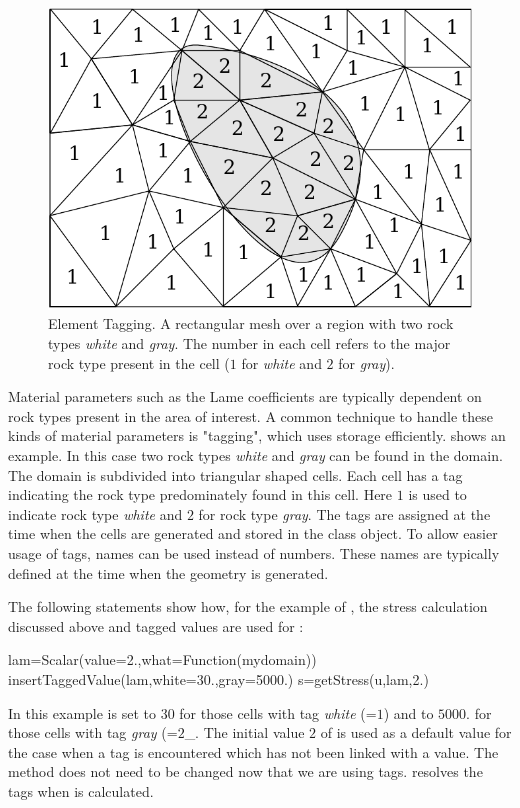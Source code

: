 \begin{figure}
\includegraphics[width=\textwidth]{figures/EscriptDiagram2}
\caption{\label{Figure: tag}Element Tagging. A rectangular mesh over a region with two rock types {\it white} and {\it gray}.
The number in each cell refers to the major rock type present in the cell ($1$ for {\it white} and $2$ for {\it gray}).
}
\end{figure}

Material parameters such as the Lame coefficients are typically dependent on rock types present in the 
area of interest. A common technique to handle these kinds of material parameters is "tagging", which
uses storage efficiently. 
shows an example. In this case two rock types {\it white} and {\it gray} can be found in the domain. The domain
is subdivided into triangular shaped cells. Each 
cell has a tag indicating the rock type predominately found in this cell. Here $1$ is used to indicate
rock type {\it white} and $2$ for rock type {\it gray}. The tags are assigned at the time when the cells are generated
and stored in the \Domain class object. To allow easier usage of tags, names can be used instead of numbers. These names are typically defined 
at the time when the geometry is generated. 

The following statements show how, for the
example of , the stress calculation discussed above and tagged values are used for
:
\begin{python}
  lam=Scalar(value=2.,what=Function(mydomain))
  insertTaggedValue(lam,white=30.,gray=5000.)
  s=getStress(u,lam,2.)
\end{python}
In this example  is set to $30$ for those cells with tag {\it white} (=$1$) and to $5000.$ for those cells 
with tag {\it gray} (=$2$_. The initial value $2$ of  is used as a default value for the case when a tag
is encountered which has not been linked with a value. The  method
does not need to be changed now that we are using tags.
\escript resolves the tags when  is calculated.

